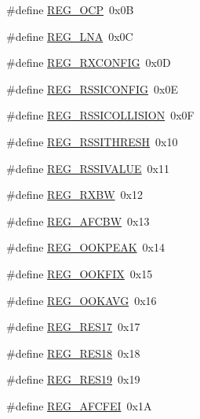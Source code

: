 \begin{DoxyCompactItemize}
\item 
\#define \mbox{\hyperlink{sx1276_regs-_fsk_8h_a4e0e13619868140039378bb218aa5a3b}{R\+E\+G\+\_\+\+O\+CP}}~0x0B
\item 
\#define \mbox{\hyperlink{sx1276_regs-_fsk_8h_ab08aa4c56ad75b3e715a1115330109ca}{R\+E\+G\+\_\+\+L\+NA}}~0x0C
\item 
\#define \mbox{\hyperlink{sx1276_regs-_fsk_8h_a6bba52e363d49d2783439eb8062d90c8}{R\+E\+G\+\_\+\+R\+X\+C\+O\+N\+F\+IG}}~0x0D
\item 
\#define \mbox{\hyperlink{sx1276_regs-_fsk_8h_a9ba1a67481c3ba0a454cb4873e4db10b}{R\+E\+G\+\_\+\+R\+S\+S\+I\+C\+O\+N\+F\+IG}}~0x0E
\item 
\#define \mbox{\hyperlink{sx1276_regs-_fsk_8h_ad810a0e5aaa761e8edbe804df2e4f5fe}{R\+E\+G\+\_\+\+R\+S\+S\+I\+C\+O\+L\+L\+I\+S\+I\+ON}}~0x0F
\item 
\#define \mbox{\hyperlink{sx1276_regs-_fsk_8h_ab3af0df6e457f5b5f994d1c19dc2642f}{R\+E\+G\+\_\+\+R\+S\+S\+I\+T\+H\+R\+E\+SH}}~0x10
\item 
\#define \mbox{\hyperlink{sx1276_regs-_fsk_8h_a7ff36314652a235acc13fa6ab5504e3d}{R\+E\+G\+\_\+\+R\+S\+S\+I\+V\+A\+L\+UE}}~0x11
\item 
\#define \mbox{\hyperlink{sx1276_regs-_fsk_8h_a1bbbafd83ab10909a8dd5385fd0dfff8}{R\+E\+G\+\_\+\+R\+X\+BW}}~0x12
\item 
\#define \mbox{\hyperlink{sx1276_regs-_fsk_8h_aa4a7b5b5d63e9f8ef8f8dc4d7984753c}{R\+E\+G\+\_\+\+A\+F\+C\+BW}}~0x13
\item 
\#define \mbox{\hyperlink{sx1276_regs-_fsk_8h_a4a6adb6f15f5e4fe71a627d96f6f8141}{R\+E\+G\+\_\+\+O\+O\+K\+P\+E\+AK}}~0x14
\item 
\#define \mbox{\hyperlink{sx1276_regs-_fsk_8h_a585aebf4bf7b6d781ac836ade0f00aad}{R\+E\+G\+\_\+\+O\+O\+K\+F\+IX}}~0x15
\item 
\#define \mbox{\hyperlink{sx1276_regs-_fsk_8h_ad0c870505b9062bb61176ba9076e9b5e}{R\+E\+G\+\_\+\+O\+O\+K\+A\+VG}}~0x16
\item 
\#define \mbox{\hyperlink{sx1276_regs-_fsk_8h_a6a38821b7a89a409d200dbd0420c92c8}{R\+E\+G\+\_\+\+R\+E\+S17}}~0x17
\item 
\#define \mbox{\hyperlink{sx1276_regs-_fsk_8h_a855a1d320f1a948b9210dbd3a7ecc4cc}{R\+E\+G\+\_\+\+R\+E\+S18}}~0x18
\item 
\#define \mbox{\hyperlink{sx1276_regs-_fsk_8h_a1459e2972b36abc24aeed3b664cbe2c1}{R\+E\+G\+\_\+\+R\+E\+S19}}~0x19
\item 
\#define \mbox{\hyperlink{sx1276_regs-_fsk_8h_a04f60f1d03035cf80cebff9648a894c0}{R\+E\+G\+\_\+\+A\+F\+C\+F\+EI}}~0x1A

\end{DoxyCompactItemize}
